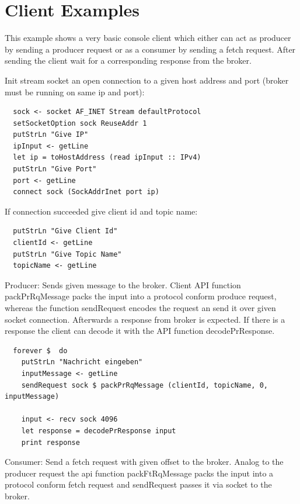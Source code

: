 \section{Client Examples}
This example shows a very basic console client which either can act as producer
by sending a producer request or as a consumer by sending a fetch request. After
sending the client wait for a corresponding response from the broker.

Init stream socket an open connection to a given host address and port (broker must be running on same ip and port): 
\begin{lstlisting}
  sock <- socket AF_INET Stream defaultProtocol 
  setSocketOption sock ReuseAddr 1
  putStrLn "Give IP"
  ipInput <- getLine
  let ip = toHostAddress (read ipInput :: IPv4)
  putStrLn "Give Port"
  port <- getLine
  connect sock (SockAddrInet port ip)
\end{lstlisting}

If connection succeeded give client id and topic name: 
\begin{lstlisting}
  putStrLn "Give Client Id"
  clientId <- getLine
  putStrLn "Give Topic Name"
  topicName <- getLine
\end{lstlisting}

Producer: Sends given message to the broker. Client API function packPrRqMessage
packs the input into a protocol conform produce request, whereas the function
sendRequest encodes the request an send it over given socket connection.
Afterwards a response from broker is expected. If there is a response the client
can decode it with the API function decodePrResponse. 
\begin{lstlisting}
  forever $  do 
    putStrLn "Nachricht eingeben"
    inputMessage <- getLine
    sendRequest sock $ packPrRqMessage (clientId, topicName, 0, inputMessage)

    input <- recv sock 4096
    let response = decodePrResponse input
    print response 
\end{lstlisting}

Consumer: Send a fetch request with given offset to the broker. Analog to the producer request 
the api function packFtRqMessage packs the input into a protocol conform fetch request and sendRequest passes it via socket to the broker. 


